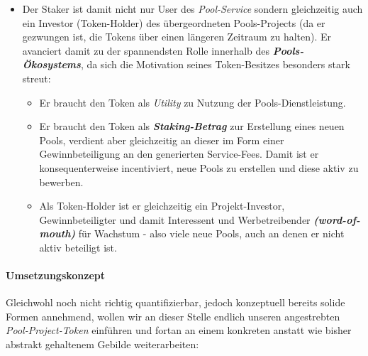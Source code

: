 \begin{Konzept}
\begin{itemize}
	\item Der Staker ist damit nicht nur User des \textit{Pool-Service} sondern gleichzeitig auch ein Investor (Token-Holder) des übergeordneten Pools-Projects (da er gezwungen ist, die Tokens über einen längeren Zeitraum zu halten). Er avanciert damit zu der spannendsten Rolle innerhalb des \textbf{\textit{Pools-Ökosystems}}, da sich die Motivation seines Token-Besitzes besonders stark streut:
	\begin{itemize}
		\item Er braucht den Token als \textit{Utility} zu Nutzung der Pools-Dienstleistung.
		\item Er braucht den Token als \textbf{\textit{Staking-Betrag}} zur Erstellung eines neuen Pools, verdient aber gleichzeitig an dieser im Form einer Gewinnbeteiligung an den generierten Service-Fees. Damit ist er konsequenterweise incentiviert, neue Pools zu erstellen und diese aktiv zu bewerben.
		\item Als Token-Holder ist er gleichzeitig ein Projekt-Investor, Gewinnbeteiligter und damit Interessent und Werbetreibender \textbf{\textit{(word-of-mouth)}} für Wachs\-tum - also viele neue Pools, auch an denen er nicht aktiv beteiligt ist.
	\end{itemize}
\end{itemize}

\end{Konzept}

\vspace{0.5cm}



\paragraph{Umsetzungskonzept}
\textbf{ }
\vspace{0.3cm}

Gleichwohl noch nicht richtig quantifizierbar, jedoch konzeptuell bereits solide Formen annehmend, wollen wir an dieser Stelle endlich unseren angestrebten \textit{Pool-Project-Token} einführen und fortan an einem konkreten anstatt wie bisher abstrakt gehaltenem Gebilde weiterarbeiten:

\vspace{0.3cm}

